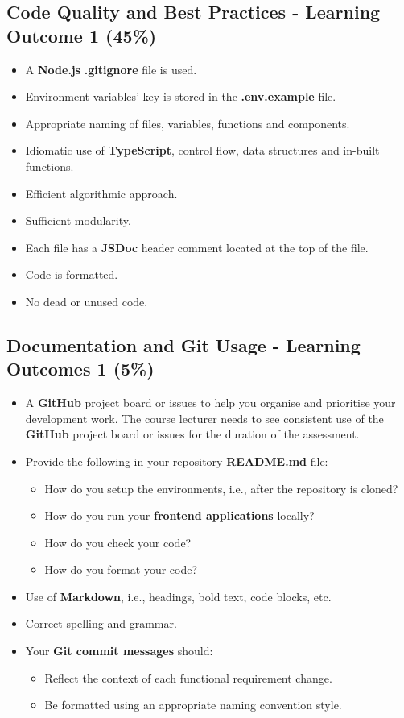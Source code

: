 \documentclass{article}
\begin{document}
\subsection*{Code Quality and Best Practices - Learning Outcome 1 (45\%)}
\begin{itemize}
	\item A \textbf{Node.js} \textbf{.gitignore} file is used.
	\item Environment variables' key is stored in the \textbf{.env.example} file. 
  	\item Appropriate naming of files, variables, functions and components.
	\item Idiomatic use of \textbf{TypeScript}, control flow, data structures and in-built functions.
	\item Efficient algorithmic approach.
	\item Sufficient modularity.
	\item Each file has a \textbf{JSDoc} header comment located at the top of the file.
	\item Code is formatted.
	\item No dead or unused code. 
\end{itemize}

\subsection*{Documentation and Git Usage - Learning Outcomes 1 (5\%)}
\begin{itemize}
	\item A \textbf{GitHub} project board or issues to help you organise and prioritise your development work. The course lecturer needs to see consistent use of the \textbf{GitHub} project board or issues for the duration of the assessment.
	\item Provide the following in your repository \textbf{README.md} file:
	\begin{itemize}
		\item How do you setup the environments, i.e., after the repository is cloned?
		\item How do you run your \textbf{frontend applications} locally?
		\item How do you check your code?
		\item How do you format your code?
	\end{itemize}
    \item Use of \textbf{Markdown}, i.e., headings, bold text, code blocks, etc.
    \item Correct spelling and grammar.
    \item Your \textbf{Git commit messages} should:
    \begin{itemize}
      \item Reflect the context of each functional requirement change.
      \item Be formatted using an appropriate naming convention style.
    \end{itemize}
\end{itemize}
\end{document}
